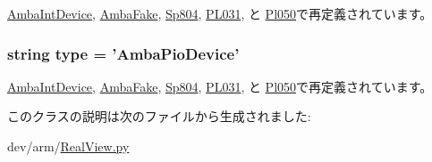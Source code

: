 \hyperlink{classRealView_1_1AmbaIntDevice_a17da7064bc5c518791f0c891eff05fda}{AmbaIntDevice}, \hyperlink{classRealView_1_1AmbaFake_a17da7064bc5c518791f0c891eff05fda}{AmbaFake}, \hyperlink{classRealView_1_1Sp804_a17da7064bc5c518791f0c891eff05fda}{Sp804}, \hyperlink{classRealView_1_1PL031_a17da7064bc5c518791f0c891eff05fda}{PL031}, と \hyperlink{classRealView_1_1Pl050_a17da7064bc5c518791f0c891eff05fda}{Pl050}で再定義されています。\hypertarget{classRealView_1_1AmbaPioDevice_acce15679d830831b0bbe8ebc2a60b2ca}{
\subsubsection[{type}]{\setlength{\rightskip}{0pt plus 5cm}string {\bf type} = '{\bf AmbaPioDevice}'}}
\label{classRealView_1_1AmbaPioDevice_acce15679d830831b0bbe8ebc2a60b2ca}


\hyperlink{classRealView_1_1AmbaIntDevice_acce15679d830831b0bbe8ebc2a60b2ca}{AmbaIntDevice}, \hyperlink{classRealView_1_1AmbaFake_acce15679d830831b0bbe8ebc2a60b2ca}{AmbaFake}, \hyperlink{classRealView_1_1Sp804_acce15679d830831b0bbe8ebc2a60b2ca}{Sp804}, \hyperlink{classRealView_1_1PL031_acce15679d830831b0bbe8ebc2a60b2ca}{PL031}, と \hyperlink{classRealView_1_1Pl050_acce15679d830831b0bbe8ebc2a60b2ca}{Pl050}で再定義されています。

このクラスの説明は次のファイルから生成されました:\begin{DoxyCompactItemize}
\item 
dev/arm/\hyperlink{RealView_8py}{RealView.py}\end{DoxyCompactItemize}
